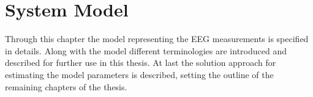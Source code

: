 \chapter{System Model}\label{ch:system_model}
Through this chapter the model representing the EEG measurements is specified in details.
Along with the model different terminologies are introduced and described for further use in this thesis. 
At last the solution approach for estimating the model parameters is described, setting the outline of the remaining chapters of the thesis. 
    

